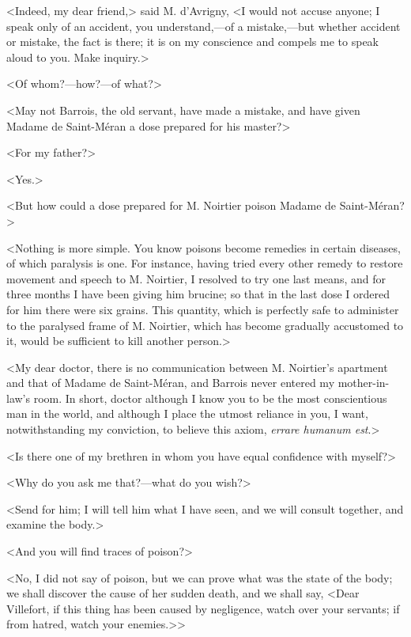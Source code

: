  <Indeed, my dear friend,> said M. d'Avrigny, <I would not accuse anyone; I speak only of an accident, you understand,—of a mistake,—but whether accident or mistake, the fact is there; it is on my conscience and compels me to speak aloud to you. Make inquiry.> 

 <Of whom?—how?—of what?> 

 <May not Barrois, the old servant, have made a mistake, and have given Madame de Saint-Méran a dose prepared for his master?> 

 <For my father?> 

 <Yes.> 

 <But how could a dose prepared for M. Noirtier poison Madame de Saint-Méran?> 

 <Nothing is more simple. You know poisons become remedies in certain diseases, of which paralysis is one. For instance, having tried every other remedy to restore movement and speech to M. Noirtier, I resolved to try one last means, and for three months I have been giving him brucine; so that in the last dose I ordered for him there were six grains. This quantity, which is perfectly safe to administer to the paralysed frame of M. Noirtier, which has become gradually accustomed to it, would be sufficient to kill another person.> 

 <My dear doctor, there is no communication between M. Noirtier's apartment and that of Madame de Saint-Méran, and Barrois never entered my mother-in-law's room. In short, doctor although I know you to be the most conscientious man in the world, and although I place the utmost reliance in you, I want, notwithstanding my conviction, to believe this axiom, \textit{errare humanum est}.> 

 <Is there one of my brethren in whom you have equal confidence with myself?> 

 <Why do you ask me that?—what do you wish?> 

 <Send for him; I will tell him what I have seen, and we will consult together, and examine the body.> 

 <And you will find traces of poison?> 

 <No, I did not say of poison, but we can prove what was the state of the body; we shall discover the cause of her sudden death, and we shall say, <Dear Villefort, if this thing has been caused by negligence, watch over your servants; if from hatred, watch your enemies.>> 

